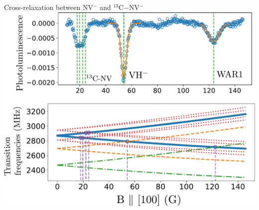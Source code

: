 \documentclass{beamer}
\begin{document}
\begin{frame}{Cross-relaxation between NV$^-$ and $^{13}$C$-$NV$^-$}
\includegraphics[scale=.48]{soustraction_3}
\end{frame}
\end{document}
